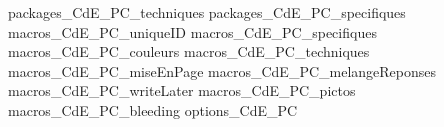 




%


\RequirePackage{import}

\def\TEXHOME{/home/eb/.vscode/extensions/qftrules.programme-colle/templates}
{packages_CdE_PC_techniques}
{packages_CdE_PC_specifiques}
{macros_CdE_PC_uniqueID}
{macros_CdE_PC_specifiques}
{macros_CdE_PC_couleurs}
{macros_CdE_PC_techniques}
{macros_CdE_PC_miseEnPage}
{macros_CdE_PC_melangeReponses}
{macros_CdE_PC_writeLater}
{macros_CdE_PC_pictos}
{macros_CdE_PC_bleeding}
{options_CdE_PC}
